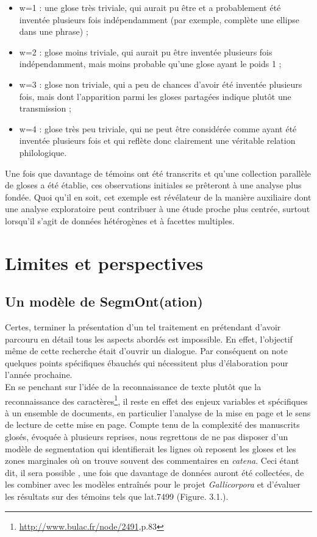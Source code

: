 \documentclass[a4paper, twoside, 12pt]{book}
\begin{document}
\begin{itemize}
\item w=1 : une glose très triviale, qui aurait pu être et a probablement été inventée plusieurs fois indépendamment (par exemple, complète une ellipse dans une phrase) ;
\item w=2 : glose moins triviale, qui aurait pu être inventée plusieurs fois indépendamment, mais moins probable qu'une glose ayant le poids 1 ;
\item w=3 : glose non triviale, qui a peu de chances d'avoir été inventée plusieurs fois, mais dont l'apparition parmi les gloses partagées indique plutôt une transmission ;
\item w=4 : glose très peu triviale, qui ne peut être considérée comme ayant été inventée plusieurs fois et qui reflète donc clairement une véritable relation philologique.
\end{itemize}
Une fois que davantage de témoins ont été transcrits et qu'une collection parallèle de gloses a été établie, ces observations initiales se prêteront à une analyse plus fondée. Quoi qu'il en soit, cet exemple est révélateur de la manière auxiliaire dont une analyse exploratoire peut contribuer à une étude proche plus centrée, surtout lorsqu'il s'agit de données hétérogènes et à facettes multiples.

\chapter{Limites et perspectives}
\section{Un modèle de SegmOnt(ation)}

Certes, terminer la présentation d’un tel traitement en prétendant d'avoir parcouru en détail tous les aspects abordés est impossible. En effet, l’objectif même de cette recherche était d’ouvrir un dialogue. Par conséquent on note quelques points spécifiques ébauchés qui nécessitent plus d’élaboration pour l'année prochaine.\\

En se penchant sur l'idée de la reconnaissance de texte plutôt que la reconnaissance des caractères\footnote{\url{http://www.bulac.fr/node/2491},p.83}, il reste en effet des enjeux variables et spécifiques à un ensemble de documents, en particulier l’analyse de la mise en page et le sens de lecture de cette mise en page. Compte tenu de la complexité des manuscrits glosés, évoquée à plusieurs reprises,  nous regrettons de ne pas disposer d'un modèle de segmentation qui identifierait  les lignes où reposent les gloses et les zones marginales où on trouve souvent des commentaires en \textit{catena}. Ceci étant dit, il sera possible , une fois que davantage de données auront été collectées, de les combiner avec les modèles entraînés pour le projet \textit{Gallicorpora} et d'évaluer les résultats sur des témoins tels que lat.7499 (Figure. 3.1.). 
\end{document}
